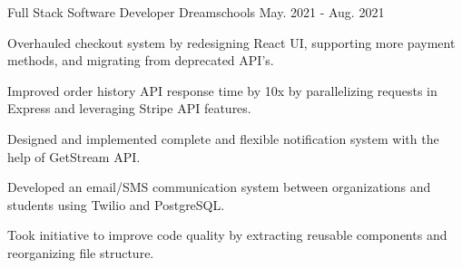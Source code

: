 \begin{cventries}
  \cventry
    {Full Stack Software Developer} %
    {Dreamschools} %
    {} %
    {May. 2021 - Aug. 2021} %
    {
      \begin{cvitems} %
        \item {Overhauled checkout system by redesigning React UI, supporting more payment methods, and migrating from deprecated API's.}
        \item {Improved order history API response time by 10x by parallelizing requests in Express and leveraging Stripe API features.}
        \item {Designed and implemented complete and flexible notification system with the help of GetStream API.}
        \item {Developed an email/SMS communication system between organizations and students using Twilio and PostgreSQL.}
        \item {Took initiative to improve code quality by extracting reusable components and reorganizing file structure.}
      \end{cvitems}
    }
\end{cventries}
